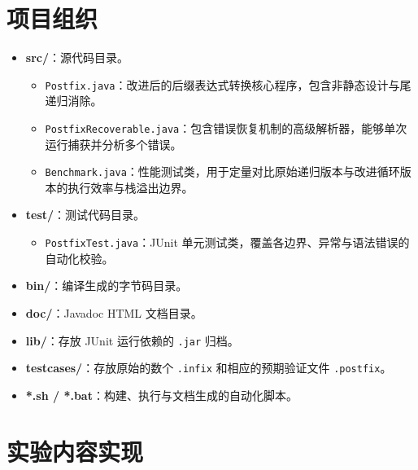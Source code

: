 \chapter{项目组织}
\begin{itemize}
  \item \textbf{src/}：源代码目录。
    \begin{itemize}
    \item \texttt{Postfix.java}：改进后的后缀表达式转换核心程序，包含非静态设计与尾递归消除。
    \item \texttt{PostfixRecoverable.java}：包含错误恢复机制的高级解析器，能够单次运行捕获并分析多个错误。
    \item \texttt{Benchmark.java}：性能测试类，用于定量对比原始递归版本与改进循环版本的执行效率与栈溢出边界。
    \end{itemize}
  \item \textbf{test/}：测试代码目录。
    \begin{itemize}
    \item \texttt{PostfixTest.java}：JUnit 单元测试类，覆盖各边界、异常与语法错误的自动化校验。
    \end{itemize}
  \item \textbf{bin/}：编译生成的字节码目录。
  \item \textbf{doc/}：Javadoc HTML 文档目录。
  \item \textbf{lib/}：存放 JUnit 运行依赖的 \texttt{.jar} 归档。
  \item \textbf{testcases/}：存放原始的数个 \texttt{.infix} 和相应的预期验证文件 \texttt{.postfix}。
  \item \textbf{*.sh / *.bat}：构建、执行与文档生成的自动化脚本。
\end{itemize}

\chapter{实验内容实现}
